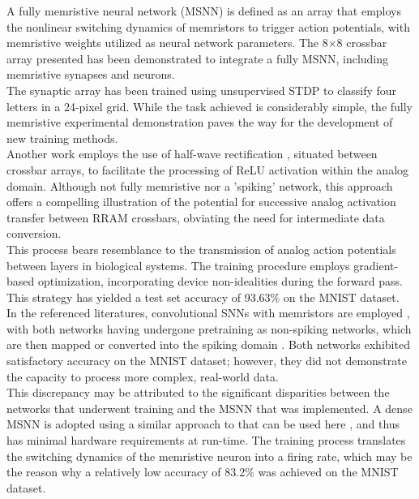 \noindent A fully memristive neural network (MSNN) is defined as an array that employs the nonlinear switching dynamics of memristors to trigger action potentials, with memristive weights utilized as neural network parameters. The 8×8 crossbar array presented \cite{wang2018fully} has been demonstrated to integrate a fully MSNN, including memristive synapses and neurons. \\

\noindent The synaptic array has been trained using unsupervised STDP to classify four letters in a 24-pixel grid. While the task achieved is considerably simple, the fully memristive experimental demonstration paves the way for the development of new training methods. \\

\noindent Another work employs the use of half-wave rectification \cite{kiani2021fully}, situated between crossbar arrays, to facilitate the processing of ReLU activation within the analog domain. Although not fully memristive nor a 'spiking' network, this approach offers a compelling illustration of the potential for successive analog activation transfer between RRAM crossbars, obviating the need for intermediate data conversion.\\

\noindent This process bears resemblance to the transmission of analog action potentials between layers in biological systems. The training procedure employs gradient-based optimization, incorporating device non-idealities during the forward pass. This strategy has yielded a test set accuracy of 93.63\% on the MNIST dataset. \\

\noindent In the referenced literatures, convolutional SNNs with memristors are employed \cite{wang2018handwritten}, with both networks having undergone pretraining as non-spiking networks, which are then mapped or converted into the spiking domain \cite{wijesinghe2018all}. Both networks exhibited satisfactory accuracy on the MNIST dataset; however, they did not demonstrate the capacity to process more complex, real-world data.\\ 

\noindent This discrepancy may be attributed to the significant disparities between the networks that underwent training and the MSNN that was implemented. A dense MSNN is adopted using a similar approach to that can be used here \cite{duan2020spiking}, and thus has minimal hardware requirements at run-time. The training process translates the switching dynamics of the memristive neuron into a firing rate, which may be the reason why a relatively low accuracy of 83.2\% was achieved on the MNIST dataset. \\

